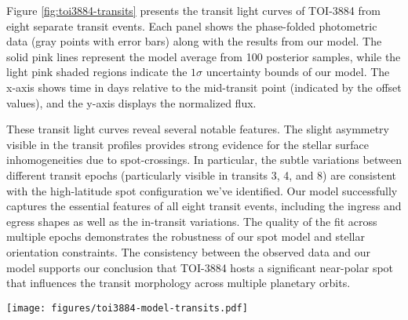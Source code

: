 \documentclass[twocolumn]{aastex631}
\begin{document}
%
Figure \ref{fig:toi3884-transits} presents the transit light curves of TOI-3884 from eight separate transit events. 
Each panel shows the phase-folded photometric data (gray points with error bars) along with the results from our model. 
The solid pink lines represent the model average from 100 posterior samples, while the light pink shaded regions indicate the 
$1\sigma$ uncertainty bounds of our model. The x-axis shows time in days relative to the mid-transit point 
(indicated by the offset values), and the y-axis displays the normalized flux.

These transit light curves reveal several notable features. The slight asymmetry visible in the transit profiles provides strong 
evidence for the stellar surface inhomogeneities due to spot-crossings. In particular, the subtle variations between different 
transit epochs (particularly visible in transits 3, 4, and 8) are consistent with the high-latitude spot configuration we've 
identified. Our model successfully captures the essential features of all eight transit events, including the ingress and egress 
shapes as well as the in-transit variations. The quality of the fit across multiple epochs demonstrates the robustness of 
our spot model and stellar orientation constraints. The consistency between the observed data and our model supports our conclusion 
that TOI-3884 hosts a significant near-polar spot that influences the transit morphology across multiple planetary orbits.

%
\begin{figure*}[hbt!]
    \centering
    \texttt{[image: figures/toi3884-model-transits.pdf]}
    \caption{Light curves for eight transit events of TOI-3884b. Each panel shows the observed photometric data from TESS (gray points 
    with error bars) and the results of our MCMC modeling. The solid pink lines represent the model average from 100 posterior 
    samples, while the light pink shaded regions indicate the 1$\sigma$ uncertainty bounds. The x-axis displays time in days 
    relative to the mid-transit point (shown as offsets at the bottom of each panel), and the y-axis shows the normalized flux. 
    The slight asymmetries and variations between transit epochs are consistent with the influence of a high-latitude stellar spot. 
    Our model successfully reproduces the observed transit profiles across all epochs, supporting our inferred spot and stellar 
    orientation parameters.}
    \label{fig:toi3884-transits}
\end{figure*}
%


\end{document}
